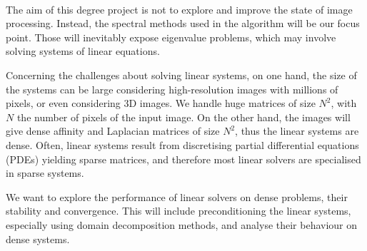 \paragraph{}
The aim of this degree project is not to explore and improve the state of image processing.
Instead, the spectral methods used in the algorithm will be our focus point.
Those will inevitably expose eigenvalue problems, which may involve solving systems of linear equations.

Concerning the challenges about solving linear systems, on one hand, the size of the systems can be large considering high-resolution images with millions of pixels, or even considering 3D images.
We handle huge matrices of size \(N^2\), with \(N\) the number of pixels of the input image.
On the other hand, the images will give dense affinity and Laplacian matrices of size \(N^2\), thus the linear systems are dense.
Often, linear systems result from discretising partial differential equations (PDEs) yielding sparse matrices, and therefore most linear solvers are specialised in sparse systems.

We want to explore the performance of linear solvers on dense problems, their stability and convergence.
This will include preconditioning the linear systems, especially using domain decomposition methods, and analyse their behaviour on dense systems.
